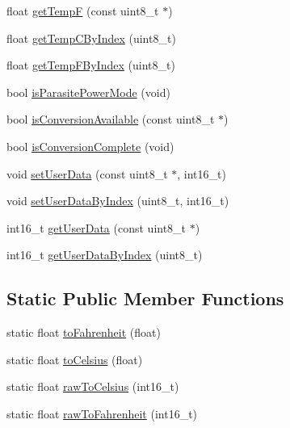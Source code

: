 \begin{DoxyCompactItemize}
float \hyperlink{class_dallas_temperature_ace033fbd8e4c7e17c4bcd7ecc8f3ebea}{get\+TempF} (const uint8\+\_\+t $\ast$)
\item 
float \hyperlink{class_dallas_temperature_a7e3e2e23257aac6b6c896df205d5b3b5}{get\+Temp\+C\+By\+Index} (uint8\+\_\+t)
\item 
float \hyperlink{class_dallas_temperature_a96318d36b313e1f4f413e2ed2b7501c7}{get\+Temp\+F\+By\+Index} (uint8\+\_\+t)
\item 
bool \hyperlink{class_dallas_temperature_a835945ed3e8d78c31791e55f22084691}{is\+Parasite\+Power\+Mode} (void)
\item 
bool \hyperlink{class_dallas_temperature_adaf460a3b8004218e97af7059d41053a}{is\+Conversion\+Available} (const uint8\+\_\+t $\ast$)
\item 
bool \hyperlink{class_dallas_temperature_a9e92719781d3ead44b95964d59edd41d}{is\+Conversion\+Complete} (void)
\item 
void \hyperlink{class_dallas_temperature_a0ed69b03ed848936ea0c8deea0e5c2ba}{set\+User\+Data} (const uint8\+\_\+t $\ast$, int16\+\_\+t)
\item 
void \hyperlink{class_dallas_temperature_a65ae6994218200e92ce43bffd122d46b}{set\+User\+Data\+By\+Index} (uint8\+\_\+t, int16\+\_\+t)
\item 
int16\+\_\+t \hyperlink{class_dallas_temperature_a3601e8ee63c4770b716817ed68664400}{get\+User\+Data} (const uint8\+\_\+t $\ast$)
\item 
int16\+\_\+t \hyperlink{class_dallas_temperature_a4af999e72b9c5b85430666ad90fa9644}{get\+User\+Data\+By\+Index} (uint8\+\_\+t)
\end{DoxyCompactItemize}
\subsection*{Static Public Member Functions}
\begin{DoxyCompactItemize}
\item 
static float \hyperlink{class_dallas_temperature_a2169f7bdd26479bbbf9f6fb3bf4e5bb2}{to\+Fahrenheit} (float)
\item 
static float \hyperlink{class_dallas_temperature_af6dfbcc587ae244c0508b6a51f2085a5}{to\+Celsius} (float)
\item 
static float \hyperlink{class_dallas_temperature_a75accb4a56858189accda00e5eabb06e}{raw\+To\+Celsius} (int16\+\_\+t)
\item 
static float \hyperlink{class_dallas_temperature_a48bc1a4d0e33f1735964c22c8bd2f6fb}{raw\+To\+Fahrenheit} (int16\+\_\+t)
\end{DoxyCompactItemize}


